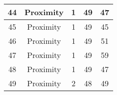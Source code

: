 \documentclass[results.tex]{subfiles}
\begin{document}
\begin{center}
\begin{tabular}{| c || c | c | c | c |}
            \hline
            44                      & Proximity                    & 1                      & 49                      & 47                   \\
            \hline
            45                      & Proximity                    & 1                      & 49                      & 45                   \\
            \hline
            46                      & Proximity                    & 1                      & 49                      & 51                   \\
            \hline
            47                      & Proximity                    & 1                      & 49                      & 59                   \\
            \hline
            48                      & Proximity                    & 1                      & 49                      & 47                   \\
            \hline
            49                      & Proximity                    & 2                      & 48                      & 49                   \\
            \hline
        \end{tabular}
    \end{center}
\end{document}
